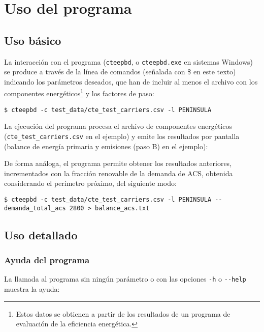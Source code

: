 \documentclass[10pt,notitlepage,oneside,a4paper]{article}
\begin{document}
\clearpage
\newpage
\section{Uso del programa}
\label{sec:usoprograma}

\subsection{Uso básico}

La interacción con el programa (\texttt{cteepbd}, o \texttt{cteepbd.exe} en sistemas Windows) se produce a través de la línea de comandos (señalada con \$ en este texto) indicando los parámetros deseados, que han de incluir al menos el archivo con los componentes energéticos\footnote{Estos datos se obtienen a partir de los resultados de un programa de evaluación de la eficiencia energética.} y los factores de paso:

\begin{Verbatim}[fontsize=\small]
	$ cteepbd -c test_data/cte_test_carriers.csv -l PENINSULA
\end{Verbatim}

La ejecución del programa procesa el archivo de componentes energéticos
(\texttt{cte\_test\_carriers.csv} en el ejemplo) y emite los resultados por pantalla (balance de energía primaria y emisiones (paso B) en el ejemplo):


De forma análoga, el programa permite obtener los resultados anteriores, incrementados con la fracción renovable de la demanda de ACS, obtenida considerando el perímetro próximo, del siguiente modo:

\begin{Verbatim}[fontsize=\small]
	$ cteepbd -c test_data/cte_test_carriers.csv -l PENINSULA --demanda_total_acs 2800 > balance_acs.txt
\end{Verbatim}



\clearpage
\newpage
\subsection{Uso detallado}

\subsubsection{Ayuda del programa}
La llamada al programa sin ningún parámetro o con las opciones \texttt{-h} o \texttt{-{}-help} muestra la ayuda:
\end{document}
